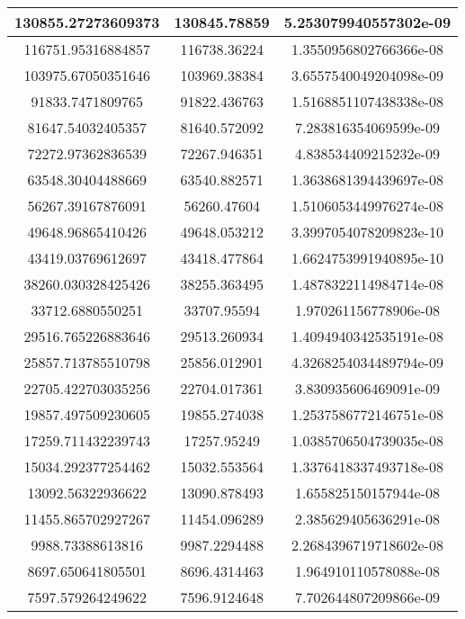 \begin{longtable}[!h]{|c|c|c|}
    \hline
    130855.27273609373 & 130845.78859 & 5.253079940557302e-09\\
    \hline
    116751.95316884857 & 116738.36224 & 1.3550956802766366e-08\\
    \hline
    103975.67050351646 & 103969.38384 & 3.6557540049204098e-09\\
    \hline
    91833.7471809765 & 91822.436763 & 1.5168851107438338e-08\\
    \hline
    81647.54032405357 & 81640.572092 & 7.283816354069599e-09\\
    \hline
    72272.97362836539 & 72267.946351 & 4.838534409215232e-09\\
    \hline
    63548.30404488669 & 63540.882571 & 1.3638681394439697e-08\\
    \hline
    56267.39167876091 & 56260.47604 & 1.5106053449976274e-08\\
    \hline
    49648.96865410426 & 49648.053212 & 3.3997054078209823e-10\\
    \hline
    43419.03769612697 & 43418.477864 & 1.6624753991940895e-10\\
    \hline
    38260.030328425426 & 38255.363495 & 1.4878322114984714e-08\\
    \hline
    33712.6880550251 & 33707.95594 & 1.970261156778906e-08\\
    \hline
    29516.765226883646 & 29513.260934 & 1.4094940342535191e-08\\
    \hline
    25857.713785510798 & 25856.012901 & 4.3268254034489794e-09\\
    \hline
    22705.422703035256 & 22704.017361 & 3.830935606469091e-09\\
    \hline
    19857.497509230605 & 19855.274038 & 1.2537586772146751e-08\\
    \hline
    17259.711432239743 & 17257.95249 & 1.0385706504739035e-08\\
    \hline
    15034.292377254462 & 15032.553564 & 1.3376418337493718e-08\\
    \hline
    13092.56322936622 & 13090.878493 & 1.655825150157944e-08\\
    \hline
    11455.865702927267 & 11454.096289 & 2.385629405636291e-08\\
    \hline
    9988.73388613816 & 9987.2294488 & 2.2684396719718602e-08\\
    \hline
    8697.650641805501 & 8696.4314463 & 1.964910110578088e-08\\
    \hline
    7597.579264249622 & 7596.9124648 & 7.702644807209866e-09\\

\end{longtable}
